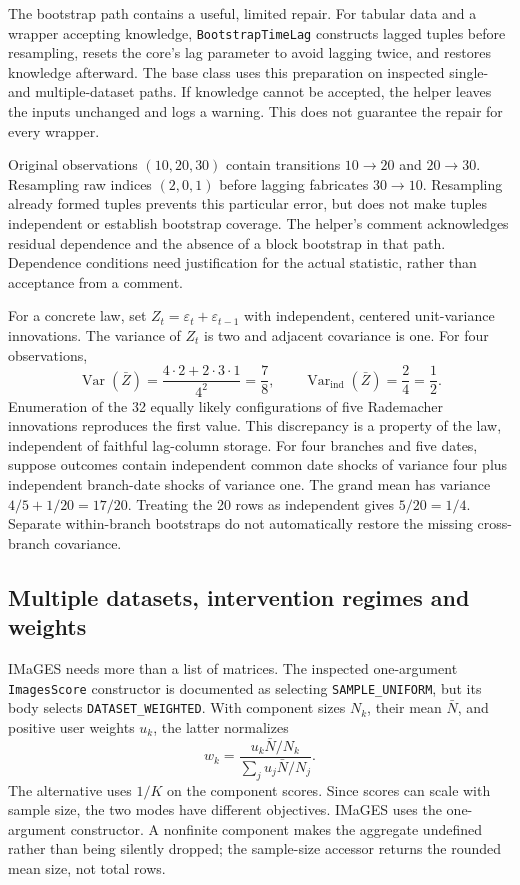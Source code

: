 The bootstrap path contains a useful, limited repair. For tabular data and a
wrapper accepting knowledge, \texttt{BootstrapTimeLag} constructs lagged
tuples before resampling, resets the core's lag parameter to avoid lagging
twice, and restores knowledge afterward. The base class uses this preparation
on inspected single- and multiple-dataset paths. If knowledge cannot be
accepted, the helper leaves the inputs unchanged and logs a warning. This
does not guarantee the repair for every wrapper.~\citep{exec15_javatemporal_tetrad}

Original observations $(10,20,30)$ contain transitions $10\rightarrow20$ and
$20\rightarrow30$. Resampling raw indices $(2,0,1)$ before lagging fabricates
$30\rightarrow10$. Resampling already formed tuples prevents this particular
error, but does not make tuples independent or establish bootstrap coverage.
The helper's comment acknowledges residual dependence and the absence of a
block bootstrap in that path. Dependence conditions need justification for
the actual statistic, rather than acceptance from a comment.
\citep{exec15_javatemporal_tetrad,exec15_javatemporal_exact}

For a concrete law, set $Z_t=\varepsilon_t+\varepsilon_{t-1}$ with independent,
centered unit-variance innovations. The variance of $Z_t$ is two and adjacent
covariance is one. For four observations,
\[
 \operatorname{Var}(\bar Z)=\frac{4\cdot2+2\cdot3\cdot1}{4^2}=\frac78,
 \qquad \operatorname{Var}_{\mathrm{ind}}(\bar Z)=\frac24=\frac12.
\]
Enumeration of the 32 equally likely configurations of five Rademacher
innovations reproduces the first value. This discrepancy is a property of the
law, independent of faithful lag-column storage. For four branches and five
dates, suppose outcomes contain independent common date shocks of variance four plus
independent branch-date shocks of variance one. The grand mean has variance
$4/5+1/20=17/20$. Treating the 20 rows as independent gives $5/20=1/4$.
Separate within-branch bootstraps do not automatically restore the missing
cross-branch covariance.~\citep{exec15_javatemporal_exact}

\subsection{Multiple datasets, intervention regimes and weights}

IMaGES needs more than a list of matrices. The inspected one-argument
\texttt{ImagesScore} constructor is documented as selecting
\texttt{SAMPLE\_UNIFORM}, but its body selects \texttt{DATASET\_WEIGHTED}.
With component sizes $N_k$, their mean $\bar N$, and positive user weights
$u_k$, the latter normalizes
\[
 w_k=\frac{u_k\bar N/N_k}{\sum_j u_j\bar N/N_j}.
\]
The alternative uses $1/K$ on the component scores. Since scores can scale
with sample size, the two modes have different objectives. IMaGES uses the
one-argument constructor. A nonfinite component makes the aggregate undefined
rather than being silently dropped; the sample-size accessor returns the
rounded mean size, not total rows.~\citep{exec15_javatemporal_tetrad}

